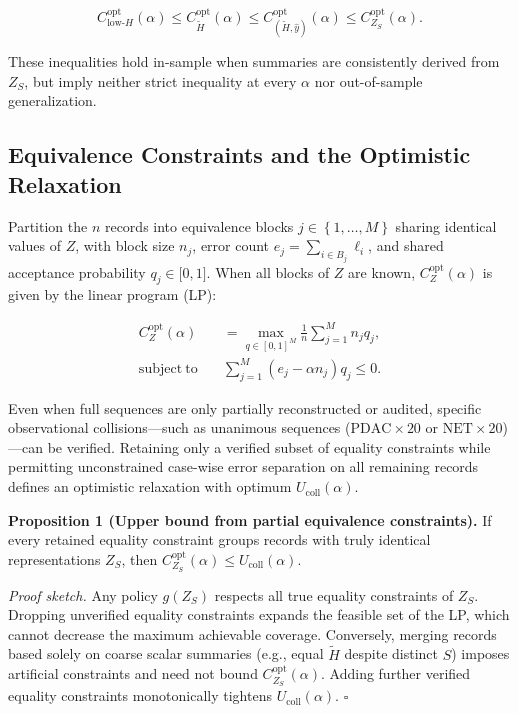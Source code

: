 \documentclass[letterpaper]{article}
\begin{document}
\[C_{\text{low-}H}^{\text{opt}}(\alpha) \leq C_{\widetilde{H}}^{\text{opt}}(\alpha) \leq C_{\left( \widetilde{H},\widehat{y} \right)}^{\text{opt}}(\alpha) \leq C_{Z_{S}}^{\text{opt}}(\alpha).\]

These inequalities hold in-sample when summaries are consistently derived from \(Z_{S}\), but imply neither strict inequality at every \(\alpha\) nor out-of-sample generalization.

\subsection{Equivalence Constraints and the Optimistic Relaxation}

Partition the \(n\) records into equivalence blocks \(j \in \left\{ 1,\ldots,M \right\}\) sharing identical values of \(Z\), with block size \(n_{j}\), error count \(e_{j} = \sum_{i \in B_{j}}^{}\ell_{i}\), and shared acceptance probability \(q_{j} \in \lbrack 0,1\rbrack\). When all blocks of \(Z\) are known, \(C_{Z}^{\text{opt}}(\alpha)\) is given by the linear program (LP):

\[\begin{aligned}
C_Z^{\mathrm{opt}}(\alpha) &= \max_{q\in[0,1]^M}\frac{1}{n}\sum_{j=1}^M n_jq_j,\\
\mathrm{subject\ to}\quad &\sum_{j=1}^M(e_j-\alpha n_j)q_j\leq0.
\end{aligned}\]

Even when full sequences are only partially reconstructed or audited, specific observational collisions---such as unanimous sequences (\(\text{PDAC} \times 20\) or \(\text{NET} \times 20\))---can be verified. Retaining only a verified subset of equality constraints while permitting unconstrained case-wise error separation on all remaining records defines an optimistic relaxation with optimum \(U_{\text{coll}}(\alpha)\).

\textbf{Proposition 1 (Upper bound from partial equivalence constraints).} If every retained equality constraint groups records with truly identical representations \(Z_{S}\), then \(C_{Z_{S}}^{\text{opt}}(\alpha) \leq U_{\text{coll}}(\alpha)\).

\emph{Proof sketch.} Any policy \(g\left( Z_{S} \right)\) respects all true equality constraints of \(Z_{S}\). Dropping unverified equality constraints expands the feasible set of the LP, which cannot decrease the maximum achievable coverage. Conversely, merging records based solely on coarse scalar summaries (e.g., equal \(\widetilde{H}\) despite distinct \(S\)) imposes artificial constraints and need not bound \(C_{Z_{S}}^{\text{opt}}(\alpha)\). Adding further verified equality constraints monotonically tightens \(U_{\text{coll}}(\alpha)\). \(\square\)
\end{document}
